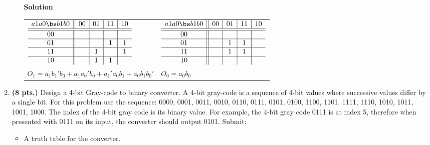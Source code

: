 \begin{enumerate}
\begin{itemize}
\begin{onlysolution}  \textbf{Solution} \itshape{
\begin{tabular}{ll}
$\begin{array} {c||c|c|c|c}
 a1 a0 \bs b1 b0 & 00 & 01 & 11 & 10 \\ \hline \hline
       00        &    &    &    &    \\ \hline
       01        &    &    & 1  & 1  \\ \hline
       11        &    & 1  &    & 1  \\ \hline
       10        &    & 1  & 1  &    \\
\end{array}$ &
$\begin{array} {c||c|c|c|c}
 a1 a0 \bs b1 b0 & 00 & 01 & 11 & 10 \\ \hline \hline
       00        &    &    &    &    \\ \hline
       01        &    & 1  & 1  &    \\ \hline
       11        &    & 1  & 1  &    \\ \hline
       10        &    &    &    &    \\
\end{array}$ \\
$O_1 = a_1b_1'b_0 + a_1a_0'b_0 + a_1'a_0b_1+a_0b_1b_0'$ & $O_0 = a_0b_0$ \\
\end{tabular}
} \end{onlysolution} 

\end{itemize}

\item  \textbf{ (8 pts.)}
Design a 4-bit Gray-code to binary converter.  A 4-bit gray-code is a 
sequence of 4-bit values where successive values differ by a single
bit.  For this problem use the sequence: 0000, 0001, 0011, 0010, 
0110, 0111, 0101, 0100, 1100, 1101, 1111, 1110, 1010, 1011, 1001, 
1000.  The index of the 4-bit gray code is its binary value.  For
example, the 4-bit gray code 0111 is at index 5, therefore when
presented with 0111 on its input, the converter should output 0101.
Submit:
\begin{itemize}
\item A truth table for the converter.


\end{itemize}
\end{enumerate}
